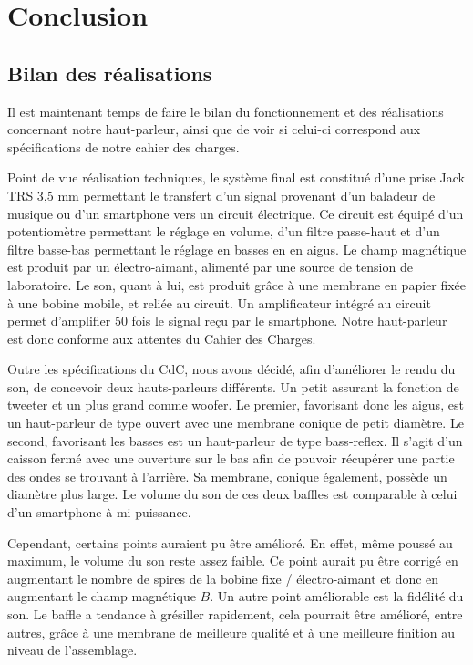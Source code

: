 \chapter{Conclusion}

\section{Bilan des réalisations}

Il est maintenant temps de faire le bilan du fonctionnement et des réalisations concernant notre haut-parleur, ainsi que de voir si celui-ci correspond aux spécifications de notre cahier des charges.

Point de vue réalisation techniques, le système final est constitué d'une prise Jack TRS 3,5 mm permettant le transfert d'un signal provenant d'un baladeur de musique ou d'un smartphone vers un circuit électrique. Ce circuit est équipé d'un potentiomètre permettant le réglage en volume, d'un filtre passe-haut et d'un filtre basse-bas permettant le réglage en basses en en aigus. Le champ magnétique est produit par un électro-aimant, alimenté par une source de tension de laboratoire. Le son, quant à lui, est produit grâce à une membrane en papier fixée à une bobine mobile, et reliée au circuit. Un amplificateur intégré au circuit permet d'amplifier 50 fois le signal reçu par le smartphone. Notre haut-parleur est donc conforme aux attentes du Cahier des Charges.

Outre les spécifications du CdC, nous avons décidé, afin d'améliorer le rendu du son, de concevoir deux hauts-parleurs différents. Un petit assurant la fonction de tweeter et un plus grand comme woofer. Le premier, favorisant donc les aigus, est un haut-parleur de type ouvert avec une membrane conique de petit diamètre. Le second, favorisant les basses est un haut-parleur de type bass-reflex. Il s'agit d'un caisson fermé avec une ouverture sur le bas afin de pouvoir récupérer une partie des ondes se trouvant à l'arrière. Sa membrane, conique également, possède un diamètre plus large. Le volume du son de ces deux baffles est comparable à celui d'un smartphone à mi puissance.

Cependant, certains points auraient pu être amélioré. En effet, même poussé au maximum, le volume du son reste assez faible. Ce point aurait pu être corrigé en augmentant le nombre de spires de la bobine fixe / électro-aimant et donc en augmentant le champ magnétique $B$. 
Un autre point améliorable est la fidélité du son. Le baffle a tendance à grésiller rapidement, cela pourrait être amélioré, entre autres, grâce à une membrane de meilleure qualité et à une meilleure finition au niveau de l'assemblage.

